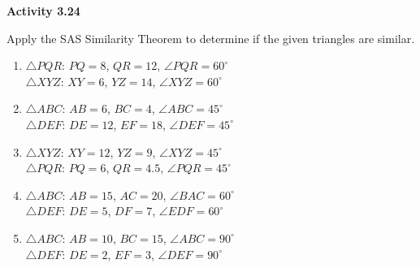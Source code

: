 \vspace{0.3ex}
\noindent\textbf{Activity 3.24}

\vspace{0.2ex}

Apply the SAS Similarity Theorem to determine if the given triangles are similar.

\begin{enumerate}[label=\color{blue}\arabic*.]
    \item \(\triangle PQR\): \(PQ = 8\), \(QR = 12\), \(\angle PQR = 60^\circ\) \\
          \(\triangle XYZ\): \(XY = 6\), \(YZ = 14\), \(\angle XYZ = 60^\circ\)
    \item \(\triangle ABC\): \(AB = 6\), \(BC = 4\), \(\angle ABC = 45^\circ\) \\
          \(\triangle DEF\): \(DE = 12\), \(EF = 18\), \(\angle DEF = 45^\circ\)
    \item \(\triangle XYZ\): \(XY = 12\), \(YZ = 9\), \(\angle XYZ = 45^\circ\) \\
          \(\triangle PQR\): \(PQ = 6\), \(QR = 4.5\), \(\angle PQR = 45^\circ\)
    \item \(\triangle ABC\): \(AB = 15\), \(AC = 20\), \(\angle BAC = 60^\circ\) \\
          \(\triangle DEF\): \(DE = 5\), \(DF = 7\), \(\angle EDF = 60^\circ\)
    \item \(\triangle ABC\): \(AB = 10\), \(BC = 15\), \(\angle ABC = 90^\circ\) \\
           \(\triangle DEF\): \(DE = 2\), \(EF = 3\), \(\angle DEF = 90^\circ\)
\end{enumerate}
